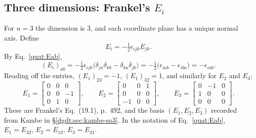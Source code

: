 \subsection{Three dimensions: Frankel's \texorpdfstring{$E_i$}{E\_i}}
For $n=3$ the dimension is $3$, and each coordinate plane has a unique
normal axis. Define
\begin{equation}\label{quat:Ei-from-Eab}
 E_i=-\tfrac12\epsilon_{ijk}E_{jk}.
\end{equation}
By Eq.~\eqref{quat:Eab},
\begin{equation}\label{quat:Ei-entries}
 (E_i)_{ab}=-\tfrac12\epsilon_{ijk}
   \bigl(\delta_{ja}\delta_{kb}-\delta_{ka}\delta_{jb}\bigr)
 =-\tfrac12\bigl(\epsilon_{iab}-\epsilon_{iba}\bigr)
 =-\epsilon_{iab}.
\end{equation}
Reading off the entries, $(E_1)_{23}=-1$, $(E_1)_{32}=1$, and similarly
for $E_2$ and $E_3$:
\begin{equation}\label{quat:frankel-Ei}
 E_1=\begin{bmatrix}0&0&0\\0&0&-1\\0&1&0\end{bmatrix},\qquad
 E_2=\begin{bmatrix}0&0&1\\0&0&0\\-1&0&0\end{bmatrix},\qquad
 E_3=\begin{bmatrix}0&-1&0\\1&0&0\\0&0&0\end{bmatrix}.
\end{equation}
These are Frankel's Eq.~(19.1), p.~492, and the basis
$(E_1,E_2,E_3)$ recorded from Kambe in \S\ref{dgdt:sec:kambe-so3}.
In the notation of Eq.~\eqref{quat:Eab}, $E_1=E_{32}$, $E_2=E_{13}$,
$E_3=E_{21}$.

